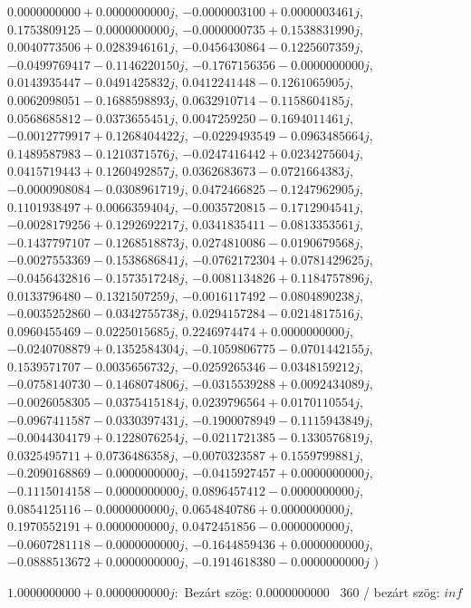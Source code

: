 \documentclass[14pt,a4paper]{article}
\begin{document}
\begin{itemize}
$0.0000000000+0.0000000000j$, $-0.0000003100+0.0000003461j$, $0.1753809125-0.0000000000j$, $-0.0000000735+0.1538831990j$, $0.0040773506+0.0283946161j$, $-0.0456430864-0.1225607359j$, $-0.0499769417-0.1146220150j$, $-0.1767156356-0.0000000000j$, $0.0143935447-0.0491425832j$, $0.0412241448-0.1261065905j$, $0.0062098051-0.1688598893j$, $0.0632910714-0.1158604185j$, $0.0568685812-0.0373655451j$, $0.0047259250-0.1694011461j$, $-0.0012779917+0.1268404422j$, $-0.0229493549-0.0963485664j$, $0.1489587983-0.1210371576j$, $-0.0247416442+0.0234275604j$, $0.0415719443+0.1260492857j$, $0.0362683673-0.0721664383j$, $-0.0000908084-0.0308961719j$, $0.0472466825-0.1247962905j$, $0.1101938497+0.0066359404j$, $-0.0035720815-0.1712904541j$, $-0.0028179256+0.1292692217j$, $0.0341835411-0.0813353561j$, $-0.1437797107-0.1268518873j$, $0.0274810086-0.0190679568j$, $-0.0027553369-0.1538686841j$, $-0.0762172304+0.0781429625j$, $-0.0456432816-0.1573517248j$, $-0.0081134826+0.1184757896j$, $0.0133796480-0.1321507259j$, $-0.0016117492-0.0804890238j$, $-0.0035252860-0.0342755738j$, $0.0294157284-0.0214817516j$, $0.0960455469-0.0225015685j$, $0.2246974474+0.0000000000j$, $-0.0240708879+0.1352584304j$, $-0.1059806775-0.0701442155j$, $0.1539571707-0.0035656732j$, $-0.0259265346-0.0348159212j$, $-0.0758140730-0.1468074806j$, $-0.0315539288+0.0092434089j$, $-0.0026058305-0.0375415184j$, $0.0239796564+0.0170110554j$, $-0.0967411587-0.0330397431j$, $-0.1900078949-0.1115943849j$, $-0.0044304179+0.1228076254j$, $-0.0211721385-0.1330576819j$, $0.0325495711+0.0736486358j$, $-0.0070323587+0.1559799881j$, $-0.2090168869-0.0000000000j$, $-0.0415927457+0.0000000000j$, $-0.1115014158-0.0000000000j$, $0.0896457412-0.0000000000j$, $0.0854125116-0.0000000000j$, $0.0654840786+0.0000000000j$, $0.1970552191+0.0000000000j$, $0.0472451856-0.0000000000j$, $-0.0607281118-0.0000000000j$, $-0.1644859436+0.0000000000j$, $-0.0888513672+0.0000000000j$, $-0.1914618380-0.0000000000j$
$\big)$
\end{itemize}
$1.0000000000+0.0000000000j$:\
Bezárt szög: $0.0000000000$ \
360 / bezárt szög: $inf$\
\end{document}
